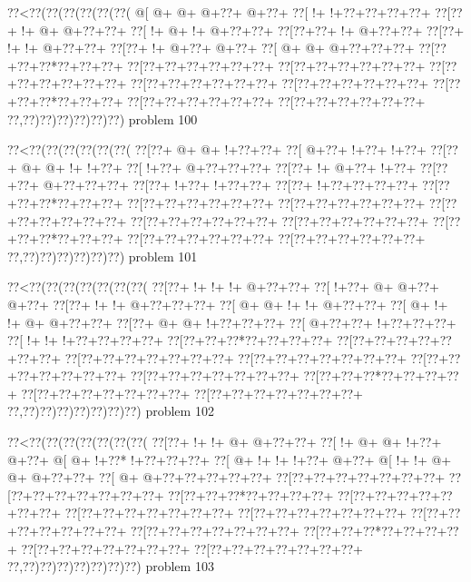 \vbox{\vbox{\goo
\0??<\0??(\0??(\0??(\0??(\0??(\0??(
\- @[\- @+\- @+\- @+\0??+\- @+\0??+
\0??[\- !+\- !+\0??+\0??+\0??+\0??+
\0??[\0??+\- !+\- @+\- @+\0??+\0??+
\0??[\- !+\- @+\- !+\- @+\0??+\0??+
\0??[\0??+\0??+\- !+\- @+\0??+\0??+
\0??[\0??+\- !+\- !+\- @+\0??+\0??+
\0??[\0??+\- !+\- @+\0??+\- @+\0??+
\0??[\- @+\- @+\- @+\0??+\0??+\0??+
\0??[\0??+\0??+\0??*\0??+\0??+\0??+
\0??[\0??+\0??+\0??+\0??+\0??+\0??+
\0??[\0??+\0??+\0??+\0??+\0??+\0??+
\0??[\0??+\0??+\0??+\0??+\0??+\0??+
\0??[\0??+\0??+\0??+\0??+\0??+\0??+
\0??[\0??+\0??+\0??+\0??+\0??+\0??+
\0??[\0??+\0??+\0??*\0??+\0??+\0??+
\0??[\0??+\0??+\0??+\0??+\0??+\0??+
\0??[\0??+\0??+\0??+\0??+\0??+\0??+
\0??,\0??)\0??)\0??)\0??)\0??)\0??)
}
\hfil problem 100\hfil\break
}

\vbox{\vbox{\goo
\0??<\0??(\0??(\0??(\0??(\0??(\0??(
\0??[\0??+\- @+\- @+\- !+\0??+\0??+
\0??[\- @+\0??+\- !+\0??+\- !+\0??+
\0??[\0??+\- @+\- @+\- !+\- !+\0??+
\0??[\- !+\0??+\- @+\0??+\0??+\0??+
\0??[\0??+\- !+\- @+\0??+\- !+\0??+
\0??[\0??+\0??+\- @+\0??+\0??+\0??+
\0??[\0??+\- !+\0??+\- !+\0??+\0??+
\0??[\0??+\- !+\0??+\0??+\0??+\0??+
\0??[\0??+\0??+\0??*\0??+\0??+\0??+
\0??[\0??+\0??+\0??+\0??+\0??+\0??+
\0??[\0??+\0??+\0??+\0??+\0??+\0??+
\0??[\0??+\0??+\0??+\0??+\0??+\0??+
\0??[\0??+\0??+\0??+\0??+\0??+\0??+
\0??[\0??+\0??+\0??+\0??+\0??+\0??+
\0??[\0??+\0??+\0??*\0??+\0??+\0??+
\0??[\0??+\0??+\0??+\0??+\0??+\0??+
\0??[\0??+\0??+\0??+\0??+\0??+\0??+
\0??,\0??)\0??)\0??)\0??)\0??)\0??)
}
\hfil problem 101\hfil\break
}

\vbox{\vbox{\goo
\0??<\0??(\0??(\0??(\0??(\0??(\0??(\0??(
\0??[\0??+\- !+\- !+\- !+\- @+\0??+\0??+
\0??[\- !+\0??+\- @+\- @+\0??+\- @+\0??+
\0??[\0??+\- !+\- !+\- @+\0??+\0??+\0??+
\0??[\- @+\- @+\- !+\- !+\- @+\0??+\0??+
\0??[\- @+\- !+\- !+\- @+\- @+\0??+\0??+
\0??[\0??+\- @+\- @+\- !+\0??+\0??+\0??+
\0??[\- @+\0??+\0??+\- !+\0??+\0??+\0??+
\0??[\- !+\- !+\- !+\0??+\0??+\0??+\0??+
\0??[\0??+\0??+\0??*\0??+\0??+\0??+\0??+
\0??[\0??+\0??+\0??+\0??+\0??+\0??+\0??+
\0??[\0??+\0??+\0??+\0??+\0??+\0??+\0??+
\0??[\0??+\0??+\0??+\0??+\0??+\0??+\0??+
\0??[\0??+\0??+\0??+\0??+\0??+\0??+\0??+
\0??[\0??+\0??+\0??+\0??+\0??+\0??+\0??+
\0??[\0??+\0??+\0??*\0??+\0??+\0??+\0??+
\0??[\0??+\0??+\0??+\0??+\0??+\0??+\0??+
\0??[\0??+\0??+\0??+\0??+\0??+\0??+\0??+
\0??,\0??)\0??)\0??)\0??)\0??)\0??)\0??)
}
\hfil problem 102\hfil\break
}

\vbox{\vbox{\goo
\0??<\0??(\0??(\0??(\0??(\0??(\0??(\0??(
\0??[\0??+\- !+\- !+\- @+\- @+\0??+\0??+
\0??[\- !+\- @+\- @+\- !+\0??+\- @+\0??+
\- @[\- @+\- !+\0??*\- !+\0??+\0??+\0??+
\0??[\- @+\- !+\- !+\- !+\0??+\- @+\0??+
\- @[\- !+\- !+\- @+\- @+\- @+\0??+\0??+
\0??[\- @+\- @+\0??+\0??+\0??+\0??+\0??+
\0??[\0??+\0??+\0??+\0??+\0??+\0??+\0??+
\0??[\0??+\0??+\0??+\0??+\0??+\0??+\0??+
\0??[\0??+\0??+\0??*\0??+\0??+\0??+\0??+
\0??[\0??+\0??+\0??+\0??+\0??+\0??+\0??+
\0??[\0??+\0??+\0??+\0??+\0??+\0??+\0??+
\0??[\0??+\0??+\0??+\0??+\0??+\0??+\0??+
\0??[\0??+\0??+\0??+\0??+\0??+\0??+\0??+
\0??[\0??+\0??+\0??+\0??+\0??+\0??+\0??+
\0??[\0??+\0??+\0??*\0??+\0??+\0??+\0??+
\0??[\0??+\0??+\0??+\0??+\0??+\0??+\0??+
\0??[\0??+\0??+\0??+\0??+\0??+\0??+\0??+
\0??,\0??)\0??)\0??)\0??)\0??)\0??)\0??)
}
\hfil problem 103\hfil\break
}

